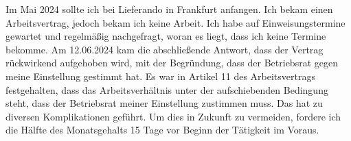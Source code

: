 		Im Mai 2024 sollte ich bei Lieferando in Frankfurt anfangen.
		Ich bekam einen Arbeitsvertrag, jedoch bekam ich keine Arbeit.
		Ich habe auf Einweisungstermine gewartet und regelmäßig nachgefragt, woran es liegt, dass ich keine Termine bekomme.
		Am 12.06.2024 kam die abschließende Antwort, dass der Vertrag rückwirkend aufgehoben wird, mit der Begründung, dass der Betriebsrat gegen meine Einstellung gestimmt hat.
		Es war in Artikel 11 des Arbeitsvertrags festgehalten, dass das Arbeitsverhältnis unter der aufschiebenden Bedingung steht, dass der Betriebsrat meiner Einstellung zustimmen muss.
		Das hat zu diversen Komplikationen geführt.
		Um dies in Zukunft zu vermeiden, fordere ich die Hälfte des Monatsgehalts 15 Tage vor Beginn der Tätigkeit im Voraus.
